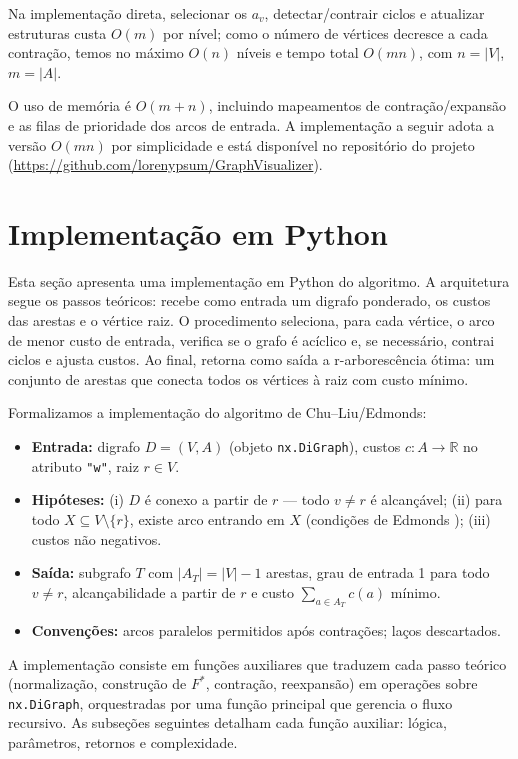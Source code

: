 Na implementação direta, selecionar os \(a_v\), detectar/contrair ciclos e atualizar estruturas custa \(O(m)\) por nível; como o número de vértices decresce a cada contração, temos no máximo \(O(n)\) níveis e tempo total \(O(mn)\), com \(n=|V|\), \(m=|A|\). 

O uso de memória é \(O(m+n)\), incluindo mapeamentos de contração/expansão e as filas de prioridade dos arcos de entrada. A implementação a seguir adota a versão \(O(mn)\) por simplicidade e está disponível no repositório do projeto (\url{https://github.com/lorenypsum/GraphVisualizer}).

\section{Implementação em Python}

Esta seção apresenta uma implementação em Python do algoritmo. A arquitetura segue os passos teóricos: recebe como entrada um digrafo ponderado, os custos das arestas e o vértice raiz. O procedimento seleciona, para cada vértice, o arco de menor custo de entrada, verifica se o grafo é acíclico e, se necessário, contrai ciclos e ajusta custos. Ao final, retorna como saída a r-arborescência ótima: um conjunto de arestas que conecta todos os vértices à raiz com custo mínimo.

Formalizamos a implementação do algoritmo de Chu--Liu/Edmonds:

\begin{itemize}\setlength{\itemsep}{2pt}
    \item \textbf{Entrada:} digrafo \(D=(V,A)\) (objeto \texttt{nx.DiGraph}), custos \(c:A\to\mathbb{R}\) no atributo \texttt{"w"}, raiz \(r\in V\).
    \item \textbf{Hipóteses:} (i) \(D\) é conexo a partir de \(r\) — todo \(v\neq r\) é alcançável; (ii) para todo \(X\subseteq V\setminus\{r\}\), existe arco entrando em \(X\) (condições de Edmonds \cite{schrijver2003comb}); (iii) custos não negativos.
    \item \textbf{Saída:} subgrafo \(T\) com \(|A_T|=|V|-1\) arestas, grau de entrada 1 para todo \(v\neq r\), alcançabilidade a partir de \(r\) e custo \(\sum_{a\in A_T} c(a)\) mínimo.
    \item \textbf{Convenções:} arcos paralelos permitidos após contrações; laços descartados.
\end{itemize}

A implementação consiste em funções auxiliares que traduzem cada passo teórico (normalização, construção de \(F^*\), contração, reexpansão) em operações sobre \texttt{nx.DiGraph}, orquestradas por uma função principal que gerencia o fluxo recursivo. As subseções seguintes detalham cada função auxiliar: lógica, parâmetros, retornos e complexidade.

